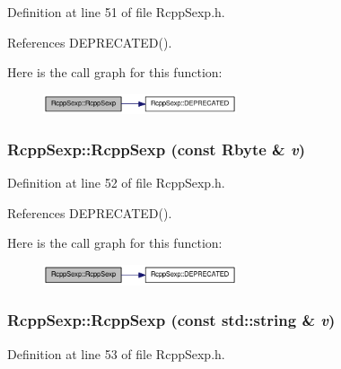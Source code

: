 Definition at line 51 of file RcppSexp.h.

References DEPRECATED().

Here is the call graph for this function:\nopagebreak
\begin{figure}[H]
\begin{center}
\leavevmode
\includegraphics[width=162pt]{classRcppSexp_a2ddf3900d04a52a59e15faebe83a4e8b_cgraph}
\end{center}
\end{figure}
\hypertarget{classRcppSexp_a325df76d427552cf1bb2d010311b8d21}{
\subsubsection[{RcppSexp}]{\setlength{\rightskip}{0pt plus 5cm}RcppSexp::RcppSexp (const Rbyte \& {\em v})}}
\label{classRcppSexp_a325df76d427552cf1bb2d010311b8d21}


Definition at line 52 of file RcppSexp.h.

References DEPRECATED().

Here is the call graph for this function:\nopagebreak
\begin{figure}[H]
\begin{center}
\leavevmode
\includegraphics[width=162pt]{classRcppSexp_a325df76d427552cf1bb2d010311b8d21_cgraph}
\end{center}
\end{figure}
\hypertarget{classRcppSexp_a0876ffb6bdb82d6fe2f30a6a73d51dbb}{
\subsubsection[{RcppSexp}]{\setlength{\rightskip}{0pt plus 5cm}RcppSexp::RcppSexp (const std::string \& {\em v})}}
\label{classRcppSexp_a0876ffb6bdb82d6fe2f30a6a73d51dbb}


Definition at line 53 of file RcppSexp.h.


